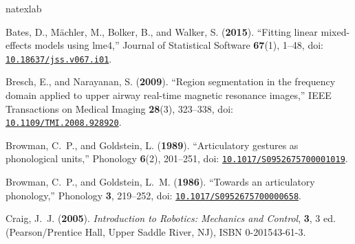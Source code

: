 \documentclass[preprint]{JASAnew}\usepackage[]{graphicx}\usepackage[]{color}
\begin{document}
\begin{thebibliography}{49}
\def\enquote#1{``#1,''}
\def\plainquote#1{``#1''}
\expandafter\ifx\csname natexlab\endcsname\relax\def\natexlab#1{#1}\fi
\providecommand{\dourl}[1]{\href{http://#1}{\nolinkurl{#1}}}
\providecommand{\bibinfo}[2]{#2}
\providecommand{\noopsort}[1]{}
\providecommand{\switchargs}[2]{#2#1}
  \def\eatspace #1{#1}
\providecommand{\dodoi}[1]{doi: \href{http://dx.doi.org/#1}{\nolinkurl{#1}}}

\bibinfo{author}{Bates, D.}, \bibinfo{author}{M{\"a}chler, M.},
  \bibinfo{author}{Bolker, B.},  and \bibinfo{author}{Walker, S.}
  (\textbf{\bibinfo{year}{2015}}). \enquote{\bibinfo{title}{Fitting linear
  mixed-effects models using {lme4}}} \bibinfo{journal}{Journal of Statistical
  Software} \textbf{67}(1), \bibinfo{pages}{1--48},
  \dodoi{10.18637/jss.v067.i01}.

\bibinfo{author}{Bresch, E.},  and \bibinfo{author}{Narayanan, S.}
  (\textbf{\bibinfo{year}{2009}}). \enquote{\bibinfo{title}{Region segmentation
  in the frequency domain applied to upper airway real-time magnetic resonance
  images}} \bibinfo{journal}{IEEE Transactions on Medical Imaging}
  \textbf{28}(3), \bibinfo{pages}{323--338}, \dodoi{10.1109/TMI.2008.928920}.

\bibinfo{author}{Browman, C.~P.},  and \bibinfo{author}{Goldstein, L.}
  (\textbf{\bibinfo{year}{1989}}). \enquote{\bibinfo{title}{Articulatory
  gestures as phonological units}} \bibinfo{journal}{Phonology} \textbf{6}(2),
  \bibinfo{pages}{201--251}, \dodoi{10.1017/S0952675700001019}.

\bibinfo{author}{Browman, C.~P.},  and \bibinfo{author}{Goldstein, L.~M.}
  (\textbf{\bibinfo{year}{1986}}). \enquote{\bibinfo{title}{Towards an
  articulatory phonology}} \bibinfo{journal}{Phonology} \textbf{3},
  \bibinfo{pages}{219--252}, \dodoi{10.1017/S0952675700000658}.

\bibinfo{author}{Craig, J.~J.} (\textbf{\bibinfo{year}{2005}}).
  \emph{\bibinfo{title}{Introduction to Robotics: Mechanics and Control}},
  \bibinfo{volume}{\textbf{3}}, \bibinfo{edition}{3} ed.
  (\bibinfo{publisher}{Pearson/Prentice Hall}, \bibinfo{address}{Upper Saddle
  River, NJ}), \bibinfo{note}{{ISBN} 0-201543-61-3}.


\end{thebibliography}
\end{document}
